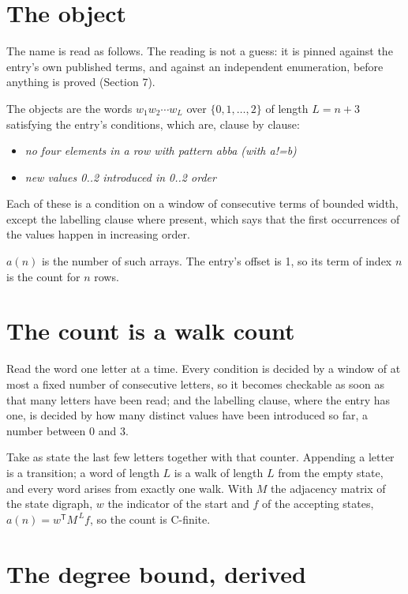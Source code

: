 \documentclass[11pt]{article}
\theoremstyle{definition}
\begin{document}
\section{The object}

The name is read as follows. The reading is not a guess: it is pinned against the entry's own published terms, and against an independent enumeration, before anything is proved (Section 7).

The objects are the words $w_1 w_2 \cdots w_L$ over $\{0,1,\dots,2\}$ of length $L = n + 3$ satisfying the entry's conditions, which are, clause by clause:

\begin{itemize}

\item {\itshape no four elements in a row with pattern abba (with a!=b)}

\item {\itshape new values 0..2 introduced in 0..2 order}

\end{itemize}

Each of these is a condition on a window of consecutive terms of bounded width, except the labelling clause where present, which says that the first occurrences of the values happen in increasing order.

$a(n)$ is the number of such arrays. The entry's offset is 1, so its term of index $n$ is the count for $n$ rows.

\section{The count is a walk count}

Read the word one letter at a time. Every condition is decided by a window of at most a fixed number of consecutive letters, so it becomes checkable as soon as that many letters have been read; and the labelling clause, where the entry has one, is decided by how many distinct values have been introduced so far, a number between $0$ and 3.

Take as state the last few letters together with that counter. Appending a letter is a transition; a word of length $L$ is a walk of length $L$ from the empty state, and every word arises from exactly one walk. With $M$ the adjacency matrix of the state digraph, $w$ the indicator of the start and $f$ of the accepting states, $a(n) = w^{\mathsf T}M^{\,L}f$, so the count is C-finite.

\section{The degree bound, derived}
\end{document}
